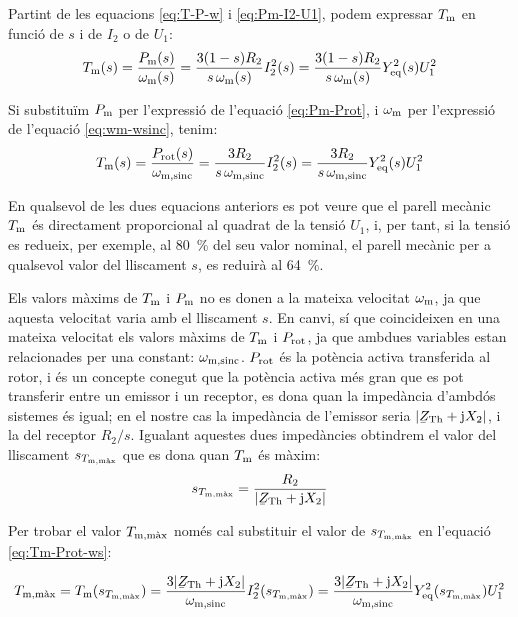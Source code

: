 Partint de les equacions \eqref{eq:T-P-w} i \eqref{eq:Pm-I2-U1}, podem expressar  $T_\mathrm{m}$ en funció de $s$ i de $I_2$ o de $U_1$:
\begin{equation}
    T_\mathrm{m}(s)  =  \frac{P_\mathrm{m}(s)}{\omega_\mathrm{m}(s)} =  \frac{3(1-s) R_2}{s\,\omega_\mathrm{m}(s)} I_2^2(s) =
     \frac{3(1-s) R_2}{s\,\omega_\mathrm{m}(s)} Y_\mathrm{eq}^2(s) U_1^2
\end{equation}

Si substituïm $P_\mathrm{m}$ per l'expressió de l'equació \eqref{eq:Pm-Prot}, i $\omega_\mathrm{m}$ per l'expressió de l'equació \eqref{eq:wm-wsinc}, tenim:
\begin{equation}\index{motors d'inducció!parell mecànic}
    T\ped{m}(s)  =  \frac{P\ped{rot}(s)}{\omega\ped{m,sinc}} =   \frac{3 R_2}{s\,\omega\ped{m,sinc}} I_2^2(s) =
     \frac{3 R_2}{s\,\omega\ped{m,sinc}} Y\ped{eq}^2(s) U_1^2 \label{eq:Tm-Prot-ws}
\end{equation}

En qualsevol de les dues equacions anteriors es pot veure que el parell mecànic $T_\mathrm{m}$ és directament proporcional al quadrat de la tensió $U_1$, i, per tant, si la tensió es redueix, per exemple, al \qty{80}{\%} del seu valor nominal, el parell mecànic per a qualsevol valor del lliscament $s$,  es reduirà al \qty{64}{\%}.

Els valors màxims de $T_\mathrm{m}$ i $P_\mathrm{m}$ no es donen a la mateixa velocitat  $\omega_\mathrm{m}$, ja que aquesta velocitat varia amb el lliscament $s$. En canvi, sí que coincideixen en una mateixa velocitat els valors  màxims de $T_\mathrm{m}$ i $P_\mathrm{rot}$, ja que ambdues variables estan relacionades per una constant: $\omega_\mathrm{m,sinc}$. $P_\mathrm{rot}$ és la potència activa transferida al rotor, i és un concepte conegut que la potència activa més gran que es pot transferir entre un emissor i un receptor, es dona quan la impedància d'ambdós sistemes és igual; en el nostre cas la impedància de l'emissor seria $|\cmplx{Z}\ped{Th} + \ju X_2|$, i la del receptor $R_2/s$. Igualant aquestes dues impedàncies obtindrem el valor del lliscament $s_{T_\mathrm{m,\text{màx}}}$ que es dona quan $T_\mathrm{m}$ és màxim:
\begin{equation}
    s_{T\ped{m,\text{màx}}} =  \frac{R_2}{|\cmplx{Z}\ped{Th} + \ju X_2|} \label{eq:s-T-max}
\end{equation}

Per trobar el valor  $T_\mathrm{m,\text{màx}}$ només cal substituir el valor de $s_{T_\mathrm{m,\text{màx}}}$ en l'equació \eqref{eq:Tm-Prot-ws}:

\begin{equation}
    T\ped{m,\text{màx}}  =  T\ped{m}(s_{T\ped{m,\text{màx}}}) =  \frac{3 |\cmplx{Z}\ped{Th} + \ju X_2|}{\omega\ped{m,sinc}} I_2^2(s_{T\ped{m,\text{màx}}}) = \frac{3 |\cmplx{Z}\ped{Th} + \ju X_2|}{\omega\ped{m,sinc}} Y\ped{eq}^2(s_{T\ped{m,\text{màx}}}) U_1^2
\end{equation}


